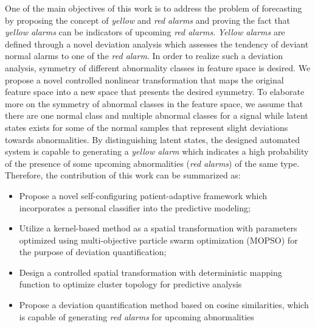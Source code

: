 
One of the main objectives of this work is to address the problem of forecasting by proposing the concept of \textit{yellow} and \textit{red alarms} and proving the fact that \textit{yellow alarms} can be indicators of upcoming \textit{red alarms}. \textit{Yellow alarms} are defined through a novel deviation analysis which assesses  the tendency of deviant normal alarms to one of the \textit{red alarm}. In order to realize such a deviation analysis, symmetry of different abnormality classes in feature space is desired. We propose a novel controlled nonlinear transformation that maps the original feature space into a new space that presents the desired symmetry. %
To elaborate more on the symmetry of abnormal classes in the feature space, we assume that there are one normal class and multiple abnormal classes for a signal while latent states exists for some of the normal samples that represent slight deviations towards abnormalities. %
By distinguishing  latent states, the designed automated system is capable to generating a \textit{yellow alarm} which indicates a high probability of the presence of some upcoming abnormalities (\textit{red alarms}) of the same type. Therefore, the contribution of this work can be summarized as:

\begin{itemize}
    \item Propose a novel self-configuring patient-adaptive framework which incorporates a personal classifier into the predictive modeling;
    \item Utilize a kernel-based method as a spatial transformation with parameters optimized using multi-objective particle swarm optimization (MOPSO) for the purpose of deviation quantification;
    \item Design a controlled spatial transformation with deterministic mapping function to optimize cluster topology for predictive analysis
    \item Propose a deviation quantification method based on cosine similarities, which is capable of generating \textit{red alarms} for upcoming abnormalities
\end{itemize}


